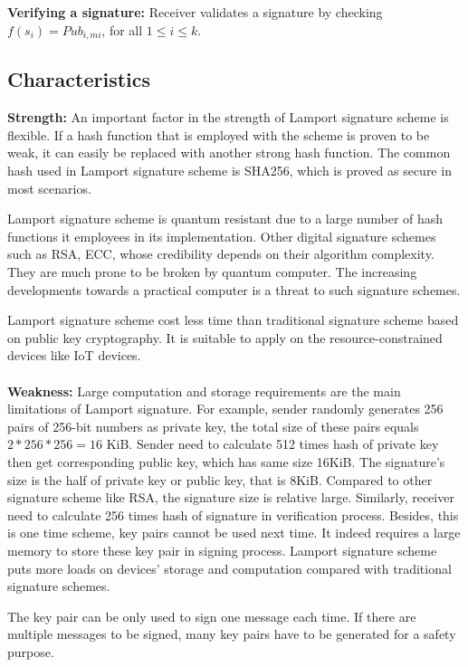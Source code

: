 \documentclass[10pt,sigconf]{acmart}
\begin{document}
\noindent \textbf{Verifying a signature:} \quad Receiver validates a signature by checking $f(s_i)= Pub_{i,mi}$, for all $1 \leq i \leq k$.

\subsection{Characteristics}

\textbf{Strength:} \quad An important factor in the strength of Lamport signature scheme is flexible. If a hash function that is employed with the scheme is proven to be weak, it can easily be replaced with another strong hash function. The common hash used in Lamport signature scheme is SHA256, which is proved as secure in most scenarios.

Lamport signature scheme is quantum resistant due to a large number of hash functions it employees in its implementation. Other digital signature schemes such as RSA, ECC, whose credibility depends on their algorithm complexity. They are much prone to be broken by quantum computer\cite{8346359}. The increasing developments towards a practical computer is a threat to such signature schemes.

Lamport signature scheme cost less time than traditional signature scheme based on public key cryptography. It is suitable to apply on the resource-constrained devices like IoT devices.
\\
\\
\noindent \textbf{Weakness:} \quad Large computation and storage requirements are the main limitations of Lamport signature. For example, sender randomly generates 256 pairs of 256-bit numbers as private key, the total size of these pairs equals $2*256*256=16$ KiB. Sender need to calculate 512 times hash of private key then get corresponding public key, which has same size 16KiB. The signature's size is the half of private key or public key, that is 8KiB. Compared to other signature scheme like RSA, the signature size is relative large. Similarly, receiver need to calculate 256 times hash of signature in verification process. Besides, this is one time scheme, key pairs cannot be used next time. It indeed requires a large memory to store these key pair in signing process. Lamport signature scheme puts more loads on devices' storage and computation compared with traditional signature schemes\cite{8402796}.

The key pair can be only used to sign one message each time. If there are multiple messages to be signed, many key pairs have to be generated for a safety purpose. 
\end{document}
